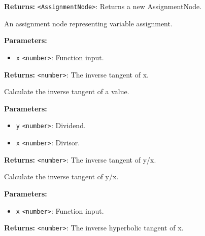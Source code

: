 \documentclass[12pt,a4paper]{article}
\begin{document}
\noindent \textbf{Returns:} \texttt{<AssignmentNode>}: Returns a new AssignmentNode.

\noindent An assignment node representing variable assignment.

\vspace{5mm}
\noindent {}


\noindent \textbf{Parameters:}
\begin{itemize}
  \item \texttt{x} \texttt{<number>}: Function input.
\end{itemize}

\noindent \textbf{Returns:} \texttt{<number>}: The inverse tangent of \textasciigrave{}x\textasciigrave{}.

\noindent Calculate the inverse tangent of a value.

\vspace{5mm}
\noindent {}


\noindent \textbf{Parameters:}
\begin{itemize}
  \item \texttt{y} \texttt{<number>}: Dividend.
  \item \texttt{x} \texttt{<number>}: Divisor.
\end{itemize}

\noindent \textbf{Returns:} \texttt{<number>}: The inverse tangent of \textasciigrave{}y/x\textasciigrave{}.

\noindent Calculate the inverse tangent of \textasciigrave{}y/x\textasciigrave{}.

\vspace{5mm}
\noindent {}


\noindent \textbf{Parameters:}
\begin{itemize}
  \item \texttt{x} \texttt{<number>}: Function input.
\end{itemize}

\noindent \textbf{Returns:} \texttt{<number>}: The inverse hyperbolic tangent of \textasciigrave{}x\textasciigrave{}.
\end{document}
